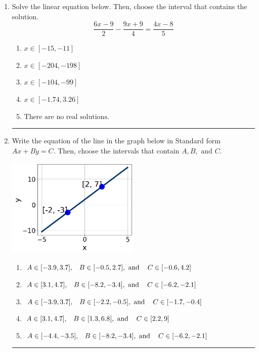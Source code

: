 \documentclass[14pt]{extbook}
\newcommand{\litem}[1]{\item#1\hspace*{-1cm}\rule{\textwidth}{0.4pt}}
\begin{document}
\begin{enumerate}
{\begin{enumerate}[label=\Alph*.]
\end{enumerate} }
\litem{
Solve the linear equation below. Then, choose the interval that contains the solution.\[ \frac{6x -9}{2} - \frac{9x + 9}{4} = \frac{4x -8}{5} \]\begin{enumerate}[label=\Alph*.]
\item \( x \in [-15, -11] \)
\item \( x \in [-204, -198] \)
\item \( x \in [-104, -99] \)
\item \( x \in [-1.74, 3.26] \)
\item \( \text{There are no real solutions.} \)

\end{enumerate} }
\litem{
Write the equation of the line in the graph below in Standard form $Ax+By=C$. Then, choose the intervals that contain $A, B, \text{ and } C$.
\begin{center}
    \includegraphics[width=0.5\textwidth]{../Figures/linearGraphToStandardCopyC.png}
\end{center}
\begin{enumerate}[label=\Alph*.]
\item \( A \in [-3.9, 3.7], \hspace{3mm} B \in [-0.5, 2.7], \text{ and } \hspace{3mm} C \in [-0.6, 4.2] \)
\item \( A \in [3.1, 4.7], \hspace{3mm} B \in [-8.2, -3.4], \text{ and } \hspace{3mm} C \in [-6.2, -2.1] \)
\item \( A \in [-3.9, 3.7], \hspace{3mm} B \in [-2.2, -0.5], \text{ and } \hspace{3mm} C \in [-1.7, -0.4] \)
\item \( A \in [3.1, 4.7], \hspace{3mm} B \in [1.3, 6.8], \text{ and } \hspace{3mm} C \in [2.2, 9] \)
\item \( A \in [-4.4, -3.5], \hspace{3mm} B \in [-8.2, -3.4], \text{ and } \hspace{3mm} C \in [-6.2, -2.1] \)


\end{enumerate}}
\end{enumerate}
\end{document}
